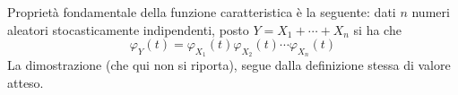 \documentclass{subfiles}
\begin{document}
Proprietà fondamentale della funzione caratteristica è la seguente: dati $n$ numeri aleatori  stocasticamente indipendenti,
posto $Y = X_{1} + \cdots + X_{n}$ si ha che
$$
    \varphi_{Y}(t) = \varphi_{X_{1}}(t) \varphi_{X_{2}}(t) \cdots \varphi_{X_{n}}(t)
$$
La dimostrazione (che qui non si riporta), segue dalla definizione stessa di valore atteso.
\end{document}
